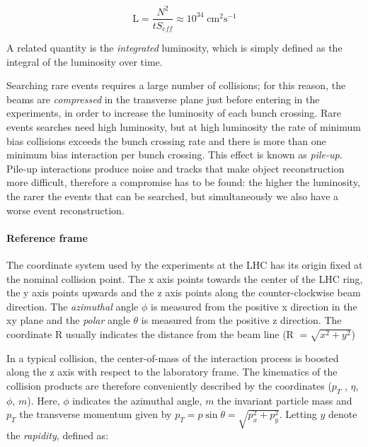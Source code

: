 \[ \text{L} = \frac{N^2}{tS_{eff}} \approx 10^{34} \; \text{cm}^2 \text{s}^{-1}
\]

A related quantity is the \emph{integrated} luminosity, which is simply defined as the integral of the luminosity over time.

Searching rare events requires a large number of collisions; for this reason, the
beams are \emph{compressed} in the transverse plane just before entering in the experiments, in order to increase the luminosity of each bunch crossing. Rare events searches need high luminosity, but at high luminosity the rate
of minimum bias collisions exceeds the
bunch crossing rate and there is more
than one minimum bias interaction per
bunch crossing. This effect is known
as \emph{pile-up}. Pile-up interactions produce noise and tracks that make object
reconstruction more difficult, therefore
a compromise has to be found: the higher
the luminosity, the rarer the events that can
be searched, but simultaneously we also have a worse event reconstruction.

\paragraph{Reference frame}


The coordinate system used by the experiments at the LHC has its origin fixed at the nominal collision point. The x axis points towards the center of the LHC ring, the y axis points
upwards and the z axis points along the counter-clockwise beam direction. The \emph{azimuthal}
angle $\phi$ is measured from the positive x direction in the xy plane and the \emph{polar} angle $\theta$ is
measured from the positive z direction. The coordinate R usually indicates the distance from
the beam line (R $= \sqrt{x^2 + y^2}$)

In a typical collision, the center-of-mass of the interaction process is boosted along the
z axis with respect to the laboratory frame. The kinematics of the collision products are
therefore conveniently described by the coordinates ($p_T$ , $\eta$, $\phi$, $m$). Here, $\phi$ indicates the
azimuthal angle, $m$ the invariant particle mass and $p_T$ the transverse momentum given by $p_T =
p\sin\theta = \sqrt{p_x^2 + p_y^2}$. Letting $y$ denote the \emph{rapidity}, defined as:

